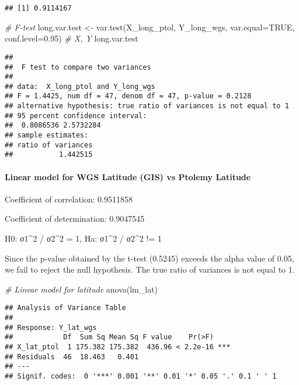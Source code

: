 \documentclass[
]{article}
\newenvironment{Shaded}{\begin{snugshade}}{\end{snugshade}}
\newcommand{\AttributeTok}[1]{\textcolor[rgb]{0.77,0.63,0.00}{#1}}
\newcommand{\CommentTok}[1]{\textcolor[rgb]{0.56,0.35,0.01}{\textit{#1}}}
\newcommand{\ConstantTok}[1]{\textcolor[rgb]{0.00,0.00,0.00}{#1}}
\newcommand{\FloatTok}[1]{\textcolor[rgb]{0.00,0.00,0.81}{#1}}
\newcommand{\FunctionTok}[1]{\textcolor[rgb]{0.00,0.00,0.00}{#1}}
\newcommand{\NormalTok}[1]{#1}
\newcommand{\OtherTok}[1]{\textcolor[rgb]{0.56,0.35,0.01}{#1}}
\begin{document}
\begin{verbatim}
## [1] 0.9114167
\end{verbatim}

\begin{Shaded}
\begin{Highlighting}[]
\CommentTok{\# F{-}test }
\NormalTok{long.var.test }\OtherTok{\textless{}{-}} \FunctionTok{var.test}\NormalTok{(X\_long\_ptol, Y\_long\_wgs, }\AttributeTok{var.equal=}\ConstantTok{TRUE}\NormalTok{, }\AttributeTok{conf.level=}\FloatTok{0.95}\NormalTok{) }\CommentTok{\# X, Y}
\NormalTok{long.var.test}
\end{Highlighting}
\end{Shaded}

\begin{verbatim}
## 
##  F test to compare two variances
## 
## data:  X_long_ptol and Y_long_wgs
## F = 1.4425, num df = 47, denom df = 47, p-value = 0.2128
## alternative hypothesis: true ratio of variances is not equal to 1
## 95 percent confidence interval:
##  0.8086536 2.5732284
## sample estimates:
## ratio of variances 
##           1.442515
\end{verbatim}

\hypertarget{linear-model-for-wgs-latitude-gis-vs-ptolemy-latitude-1}{%
\paragraph{Linear model for WGS Latitude (GIS) vs Ptolemy
Latitude}\label{linear-model-for-wgs-latitude-gis-vs-ptolemy-latitude-1}}

Coefficient of correlation: 0.9511858

Coefficient of determination: 0.9047545

H0: σ1\^{}2 / σ2\^{}2 = 1, Ha: σ1\^{}2 / σ2\^{}2 != 1

Since the p-value obtained by the t-test (0.5245) exceeds the alpha
value of 0.05, we fail to reject the null hypothesis. The true ratio of
variances is not equal to 1.

\begin{Shaded}
\begin{Highlighting}[]
\CommentTok{\# Linear model for latitude}
\FunctionTok{anova}\NormalTok{(lm\_lat)}
\end{Highlighting}
\end{Shaded}

\begin{verbatim}
## Analysis of Variance Table
## 
## Response: Y_lat_wgs
##            Df  Sum Sq Mean Sq F value    Pr(>F)    
## X_lat_ptol  1 175.382 175.382  436.96 < 2.2e-16 ***
## Residuals  46  18.463   0.401                      
## ---
## Signif. codes:  0 '***' 0.001 '**' 0.01 '*' 0.05 '.' 0.1 ' ' 1
\end{verbatim}
\end{document}
